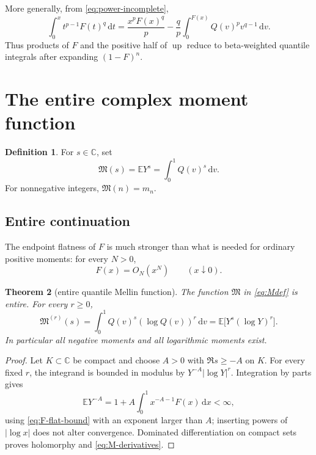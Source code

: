 \documentclass[11pt,oneside]{article}
\newtheorem{theorem}{Theorem}[section]
\theoremstyle{definition}
\newtheorem{definition}[theorem]{Definition}
\newcommand{\F}{F}
\newcommand{\Q}{Q}
\newcommand{\upf}{\operatorname{up}}
\newcommand{\M}{\mathfrak M}
\newcommand{\E}{\mathbb E}
\newcommand{\C}{\mathbb C}
\newcommand{\dd}{\,\mathrm d}
\begin{document}
More generally, from \cref{eq:power-incomplete},
\begin{equation}\label{eq:Fpower-antiderivative}
 \int_0^x t^{p-1}\F(t)^q\dd t
 =\frac{x^p\F(x)^q}{p}
 -\frac{q}{p}\int_0^{\F(x)}\Q(v)^p v^{q-1}\dd v.
\end{equation}
Thus products of \(\F\) and the positive half of \(\upf\) reduce to beta-weighted
quantile integrals after expanding \((1-\F)^n\).

\section{The entire complex moment function}

\begin{definition}\label{def:M}
For \(s\in\C\), set
\begin{equation}\label{eq:Mdef}
 \M(s)=\E Y^s=\int_0^1\Q(v)^s\dd v.
\end{equation}
For nonnegative integers, \(\M(n)=m_n\).
\end{definition}

\subsection{Entire continuation}

The endpoint flatness of \(\F\) is much stronger than what is needed for ordinary
positive moments: for every \(N>0\),
\begin{equation}\label{eq:F-flat-bound}
 \F(x)=O_N(x^N)\qquad(x\downarrow0).
\end{equation}

\begin{theorem}[entire quantile Mellin function]\label{thm:entireM}
The function \(\M\) in \cref{eq:Mdef} is entire.  For every \(r\ge0\),
\begin{equation}\label{eq:M-derivatives}
 \M^{(r)}(s)=\int_0^1\Q(v)^s(\log\Q(v))^r\dd v
 =\E\bigl[Y^s(\log Y)^r\bigr].
\end{equation}
In particular all negative moments and all logarithmic moments exist.
\end{theorem}

\begin{proof}
Let \(K\subset\C\) be compact and choose \(A>0\) with \(\Re s\ge-A\) on \(K\).
For every fixed \(r\), the integrand is bounded in modulus by
\(Y^{-A}|\log Y|^r\).  Integration by parts gives
\[
 \E Y^{-A}=1+A\int_0^1x^{-A-1}\F(x)\dd x<\infty,
\]
using \cref{eq:F-flat-bound} with an exponent larger than \(A\); inserting powers of
\(|\log x|\) does not alter convergence.  Dominated differentiation on compact sets
proves holomorphy and \cref{eq:M-derivatives}.
\end{proof}
\end{document}
